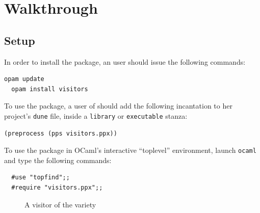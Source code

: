 \documentclass[11pt,a4paper,twoside]{article}
\begin{document}

\section{Walkthrough}


\subsection{Setup}
\label{sec:intro:setup}

\enlargethispage{\baselineskip}

In order to install the \visitors package, an \opam user should issue the
following commands:
\begin{lstlisting}[keywords={}]
  opam update
  opam install visitors
\end{lstlisting}
To use the package,
a user of \dune should add the following incantation
to her project's \texttt{dune} file,
inside a \texttt{library} or \texttt{executable} stanza:
\begin{lstlisting}[keywords={}]
  (preprocess (pps visitors.ppx))
\end{lstlisting}
To use the \visitors package in OCaml's interactive ``toplevel'' environment,
launch \texttt{ocaml} and type the following commands:
\begin{lstlisting}
  #use "topfind";;
  #require "visitors.ppx";;
\end{lstlisting}


\begin{figure}[t]
\vspace{-\baselineskip}
\caption{A visitor of the \iter variety}
\label{fig:expr00}
\end{figure}
\end{document}
